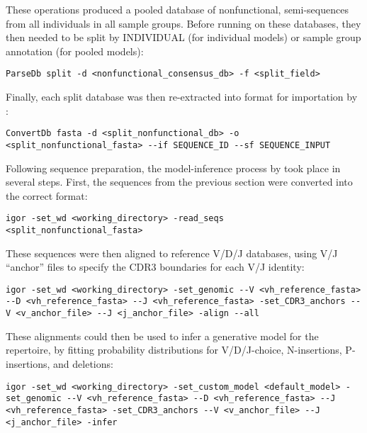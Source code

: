 \noindent These operations produced a pooled database of nonfunctional, semi-\naive sequences from all individuals in all sample groups. Before running  on these databases, they then needed to be split by INDIVIDUAL (for individual models) or sample group annotation (for pooled models):

\begin{lstlisting}
ParseDb split -d <nonfunctional_consensus_db> -f <split_field> 
\end{lstlisting}

\noindent Finally, each split database was then re-extracted into  format for importation by :

\begin{lstlisting}
ConvertDb fasta -d <split_nonfunctional_db> -o <split_nonfunctional_fasta> --if SEQUENCE_ID --sf SEQUENCE_INPUT
\end{lstlisting}


Following sequence preparation, the model-inference process by  took place in several steps. First, the sequences from the previous section were converted into the correct format:

\begin{lstlisting}
igor -set_wd <working_directory> -read_seqs <split_nonfunctional_fasta>
\end{lstlisting}

\noindent These sequences were then aligned to reference V/D/J databases, using V/J ``anchor'' files to specify the CDR3 boundaries for each V/J identity:

\begin{lstlisting}
igor -set_wd <working_directory> -set_genomic --V <vh_reference_fasta> --D <vh_reference_fasta> --J <vh_reference_fasta> -set_CDR3_anchors --V <v_anchor_file> --J <j_anchor_file> -align --all
\end{lstlisting}

\noindent These alignments could then be used to infer a generative model for the repertoire, by fitting probability distributions for V/D/J-choice, N-insertions, P-insertions, and deletions:

\begin{lstlisting}
igor -set_wd <working_directory> -set_custom_model <default_model> -set_genomic --V <vh_reference_fasta> --D <vh_reference_fasta> --J <vh_reference_fasta> -set_CDR3_anchors --V <v_anchor_file> --J <j_anchor_file> -infer
\end{lstlisting}

